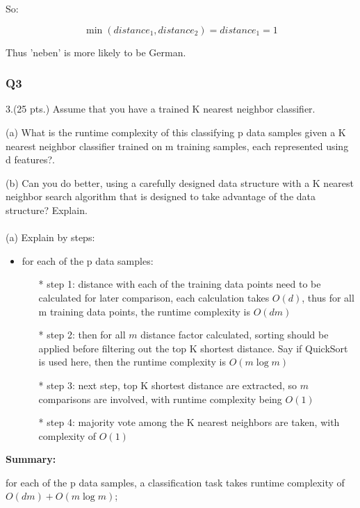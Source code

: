 \documentclass[11pt]{article}
\begin{document}
So:

\[\min (distance_1, distance_2) = distance_1 = 1\]

Thus 'neben' is more likely to be German.

    \subsubsection*{Q3}\label{q3}

    3.(25 pts.) Assume that you have a trained K nearest neighbor
classifier.

(a) What is the runtime complexity of this classifying p data samples
    given a K nearest neighbor classifier trained on m training samples,
    each represented using d features?.

(b) Can you do better, using a carefully designed data structure with a
    K nearest neighbor search algorithm that is designed to take
    advantage of the data structure? Explain.\\\\

\noindent (a)
Explain by steps:

\begin{itemize}
\item
  for each of the p data samples:

  \begin{itemize}
  \item[*]
    step 1: distance with each of the training data points need to be
    calculated for later comparison, each calculation takes \(O(d)\),
    thus for all m training data points, the runtime complexity is
    \(O(dm)\)
  \item[*]
    step 2: then for all \(m\) distance factor calculated, sorting
    should be applied before filtering out the top K shortest distance.
    Say if QuickSort is used here, then the runtime complexity is
    \(O(m \log m)\)
  \item[*]
    step 3: next step, top K shortest distance are extracted, so \(m\)
    comparisons are involved, with runtime complexity being \(O(1)\)
  \item[*]
    step 4: majority vote among the K nearest neighbors are taken, with
    complexity of \(O(1)\)
  \end{itemize}
\end{itemize}

\noindent \textbf{Summary: }

for each of the p data samples, a classification task takes runtime
complexity of \(O(dm) + O(m \log m)\);
\end{document}
